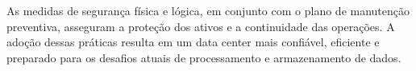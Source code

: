 \documentclass[
	12pt,				%
	oneside,			%
	a4paper,			%
	english,			%
	brazil				%
	]{abntex2unama}
\begin{document}
As medidas de segurança física e lógica, em conjunto com o plano de manutenção preventiva, asseguram a proteção dos ativos e a continuidade das operações. A adoção dessas práticas resulta em um data center mais confiável, eficiente e preparado para os desafios atuais de processamento e armazenamento de dados.

\postextual

% 

%
%

\end{document}

